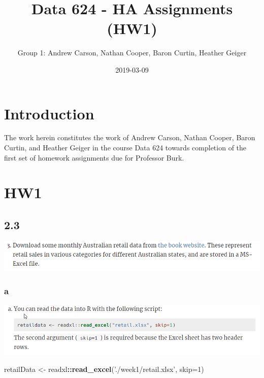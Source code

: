 \documentclass[]{book}
\title{Data 624 - HA Assignments (HW1)}
\author{Group 1: Andrew Carson, Nathan Cooper, Baron Curtin, Heather Geiger}
\date{2019-03-09}
\newenvironment{Shaded}{\begin{snugshade}}{\end{snugshade}}
\newcommand{\DataTypeTok}[1]{\textcolor[rgb]{0.13,0.29,0.53}{#1}}
\newcommand{\DecValTok}[1]{\textcolor[rgb]{0.00,0.00,0.81}{#1}}
\newcommand{\KeywordTok}[1]{\textcolor[rgb]{0.13,0.29,0.53}{\textbf{#1}}}
\newcommand{\NormalTok}[1]{#1}
\newcommand{\OperatorTok}[1]{\textcolor[rgb]{0.81,0.36,0.00}{\textbf{#1}}}
\newcommand{\StringTok}[1]{\textcolor[rgb]{0.31,0.60,0.02}{#1}}
\begin{document}
\maketitle

{
\setcounter{tocdepth}{1}
\tableofcontents
}
\hypertarget{introduction}{%
\chapter{Introduction}\label{introduction}}

The work herein constitutes the work of Andrew Carson, Nathan Cooper, Baron Curtin, and Heather Geiger in the course Data 624 towards completion of the first set of homework assignments due for Professor Burk.

\hypertarget{hw1}{%
\chapter{HW1}\label{hw1}}

\hypertarget{section}{%
\section{2.3}\label{section}}

\includegraphics{./week1/2.3.png}

\hypertarget{a}{%
\subsection{a}\label{a}}

\includegraphics{./week1/2.3a.png}

\begin{Shaded}
\begin{Highlighting}[]
\NormalTok{retailData <-}\StringTok{  }\NormalTok{readxl}\OperatorTok{::}\KeywordTok{read_excel}\NormalTok{(}\StringTok{'./week1/retail.xlsx'}\NormalTok{, }\DataTypeTok{skip=}\DecValTok{1}\NormalTok{)}
\end{Highlighting}
\end{Shaded}
\end{document}
